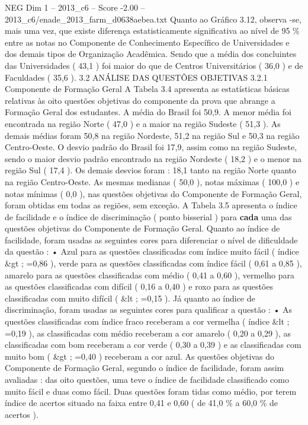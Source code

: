 \begin{textsample}{NEG Dim 1 – 2013\_c6 – Score -2.00 – 2013\_c6/enade\_2013\_farm\_d0638aebea.txt}
Quanto ao Gráfico 3.12, observa -se, mais uma vez, que existe diferença estatisticamente significativa ao nível de 95 \% entre as notas no Componente de Conhecimento Específico de Universidades e dos demais tipos de Organização Acadêmica.
Sendo que a média dos concluintes das Universidades ( 43,1 ) foi maior do que de Centros Universitários ( 36,0 ) e de Faculdades ( 35,6 ). 3.2 ANÁLISE DAS QUESTÕES OBJETIVAS 3.2.1 Componente de Formação Geral A Tabela 3.4 apresenta as estatísticas básicas relativas às oito questões objetivas do componente da prova que abrange a Formação Geral dos estudantes.
A média do Brasil foi 50,9.
A menor média foi encontrada na região Norte ( 47,0 ) e a maior na região Sudeste ( 51,3 ).
As demais médias foram 50,8 na região Nordeste, 51,2 na região Sul e 50,3 na região Centro-Oeste.
O desvio padrão do Brasil foi 17,9, assim como na região Sudeste, sendo o maior desvio padrão encontrado na região Nordeste ( 18,2 ) e o menor na região Sul ( 17,4 ).
Os demais desvios foram : 18,1 tanto na região Norte quanto na região Centro-Oeste.
As mesmas medianas ( 50,0 ), notas máximas ( 100,0 ) e notas mínimas ( 0,0 ), nas questões objetivas do Componente de Formação Geral, foram obtidas em todas as regiões, sem exceção.
A Tabela 3.5 apresenta o índice de facilidade e o índice de discriminação ( ponto bisserial ) para \textbf{cada} uma das questões objetivas do Componente de Formação Geral.
Quanto ao índice de facilidade, foram usadas as seguintes cores para diferenciar o nível de dificuldade da questão : • Azul para as questões classificadas com índice muito fácil ( índice \&gt ; =0,86 ), verde para as questões classificadas com índice fácil ( 0,61 a 0,85 ), amarelo para as questões classificadas com médio ( 0,41 a 0,60 ), vermelho para as questões classificadas com difícil ( 0,16 a 0,40 ) e roxo para as questões classificadas com muito difícil ( \&lt ; =0,15 ).
Já quanto ao índice de discriminação, foram usadas as seguintes cores para qualificar a questão : • As questões classificadas com índice fraco receberam a cor vermelha ( índice \&lt ; =0,19 ), as classificadas com médio receberam a cor amarelo ( 0,20 a 0,29 ), as classificadas com bom receberam a cor verde ( 0,30 a 0,39 ) e as classificadas com muito bom ( \&gt ; =0,40 ) receberam a cor azul.
As questões objetivas do Componente de Formação Geral, segundo o índice de facilidade, foram assim avaliadas : das oito questões, uma teve o índice de facilidade classificado como muito fácil e duas como fácil.
Duas questões foram tidas como médio, por terem índice de acertos situado na faixa entre 0,41 e 0,60 ( de 41,0 \% a 60,0 \% de acertos ).

\end{textsample}
